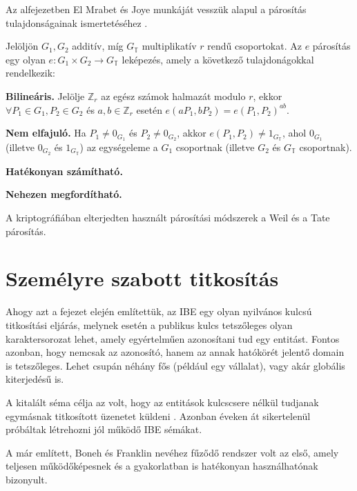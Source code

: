 Az alfejezetben El Mrabet és Joye munkáját vesszük alapul a párosítás tulajdonságainak ismertetéséhez \citeyear{GuideToPairingBasedCrypto}.

Jelöljön $G_1, G_2$ additív, míg $G_\mathbb{T}$ multiplikatív $r$ rendű csoportokat. Az $e$ párosítás egy olyan $e : G_1 \times G_2 \rightarrow G_\mathbb{T}$ leképezés, amely a következő tulajdonágokkal rendelkezik:
\begin{outdentlist}
    \item[] \textbf{Bilineáris.} Jelölje $\mathbb{Z}_r$ az egész számok halmazát modulo $r$, ekkor $\forall P_1 \in G_1, P_2 \in G_2$ és $a, b \in \mathbb{Z}_r$ esetén $e(aP_1, bP_2) = e(P_1, P_2)^{ab}$.

    \item[] \textbf{Nem elfajuló.} Ha $P_1 \neq 0_{G_1}$ és $P_2 \neq 0_{G_2}$, akkor $e(P_1, P_2) \neq 1_{G_\mathbb{T}}$, ahol $0_{G_1}$ (illetve $0_{G_2}$ és $1_{G_\mathbb{T}}$) az egységeleme a $G_1$ csoportnak (illetve $G_2$ és $G_\mathbb{T}$ csoportnak).

    \item[] \textbf{Hatékonyan számítható.}

    \item[] \textbf{Nehezen megfordítható.}
\end{outdentlist}

A kriptográfiában elterjedten használt párosítási módszerek a Weil és a Tate párosítás.

\section{Személyre szabott titkosítás}

Ahogy azt a fejezet elején említettük, az IBE egy olyan nyilvános kulcsú titkosítási eljárás, melynek esetén a publikus kulcs tetszőleges olyan karaktersorozat lehet, amely egyértelműen azonosítani tud egy entitást. Fontos azonban, hogy nemcsak az azonosító, hanem az annak hatókörét jelentő domain is tetszőleges. Lehet csupán néhány fős (például egy vállalat), vagy akár globális kiterjedésű is.

A kitalált séma célja az volt, hogy az entitások kulcscsere nélkül tudjanak egymásnak titkosított üzenetet küldeni \cite{AdiShamirIBE}. Azonban éveken át sikertelenül próbáltak létrehozni jól működő IBE sémákat.

A már említett, Boneh és Franklin \citeyear{Boneh::IdentityBasedEncryptionFromTheWeilPairing} nevéhez fűződő rendszer volt az első, amely teljesen működőképesnek és a gyakorlatban is hatékonyan használhatónak bizonyult.

